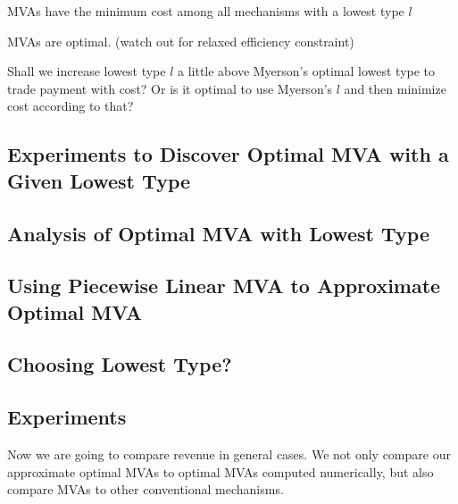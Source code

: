 \begin{theorem}

MVAs have the minimum cost among all mechanisms with a lowest type $l$

\end{theorem}

\begin{theorem}

MVAs are optimal. (watch out for relaxed efficiency constraint)

\end{theorem}

\begin{corollary}

Shall we increase lowest type $l$ a little above Myerson's optimal lowest type
to trade payment with cost? Or is it optimal to use Myerson's $l$ and then
minimize cost according to that?

\end{corollary}

\subsection{Experiments to Discover Optimal MVA with a Given Lowest Type}

\subsection{Analysis of Optimal MVA with Lowest Type}

\subsection{Using Piecewise Linear MVA to Approximate Optimal MVA}

\subsection{Choosing Lowest Type?}

\subsection{Experiments}

Now we are going to compare revenue in general cases. We not only compare our
approximate optimal MVAs to optimal MVAs computed numerically, but also compare
MVAs to other conventional mechanisms.


